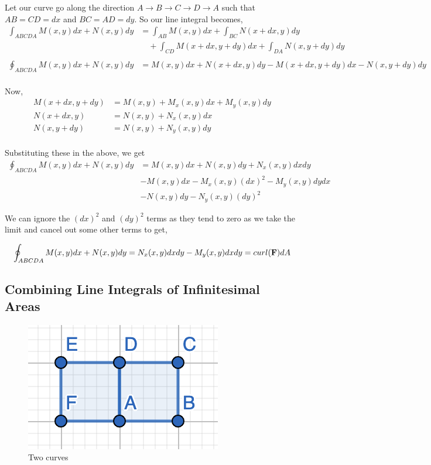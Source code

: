 Let our curve go along the direction $A \to B \to C \to D \to A$ such that $AB = CD = dx$ and $BC = AD = dy$.
So our line integral becomes,
\begin{align*}
\int_{ABCDA} M(x, y)dx + N(x, y)dy & = \int_{AB} M(x, y) dx + \int_{BC} N(x+dx, y) dy  \\
& \quad + \int_{CD} M(x+dx, y+dy) dx + \int_{DA} N(x, y+dy) dy \\
\\
\oint_{ABCDA} M(x, y)dx + N(x, y)dy & = M(x, y) dx + N(x + dx, y) dy - M(x+dx, y+dy) dx - N(x, y+dy) dy \\
\end{align*}

Now, 
\begin{align*}
M(x + dx, y + dy) & = M(x, y) + M_x(x, y) dx + M_y(x, y) dy \\
N(x + dx, y) & = N(x, y) + N_x(x, y) dx \\
N(x, y + dy) & = N(x, y) + N_y(x, y) dy \\
\end{align*}

Substituting these in the above, we get
\begin{align*}
\oint_{ABCDA} M(x, y) dx + N(x, y) dy & = M(x, y) dx + N(x, y) dy + N_x(x, y) dx dy \\
& - M(x, y) dx - M_x(x, y) (dx)^2 - M_y(x, y) dy dx \\
& - N(x, y) dy - N_y(x, y) (dy)^2
\end{align*}

We can ignore the $(dx)^2$ and $(dy)^2$ terms as they tend to zero as we take the limit 
and cancel out some other terms to get,

$$
\oint_{ABCDA} M(x, y) dx + N(x, y) dy = N_x(x, y) dx dy - M_y(x, y) dx dy = curl({\bf F}) dA
$$


\subsection{Combining Line Integrals of Infinitesimal Areas}

\begin{figure}[ht!]
    \centering
    \includegraphics[scale=0.8]{./images/lecture_18_figure_2.png}
    \caption{Two curves}
\end{figure}

